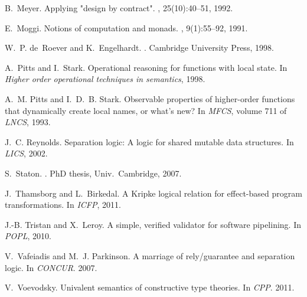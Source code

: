 \documentclass[orivec]{llncs}
\newif\ifapp\apptrue
\begin{document}
\begin{thebibliography}{10}
B.~Meyer.
\newblock Applying "design by contract".
, 25(10):40--51, 1992.


E.~Moggi.
\newblock Notions of computation and monads.
, 9(1):55--92, 1991.


W.~P. de~Roever and K.~Engelhardt.
.
\newblock Cambridge University Press, 1998.



A.~Pitts and I.~Stark.
\newblock Operational reasoning for functions with local state.
\newblock In {\em Higher order operational techniques in semantics},
1998.

A.~M. Pitts and I.~D.~B. Stark.
\newblock Observable properties of higher-order functions that dynamically
  create local names, or what's new?
\newblock In {\em MFCS}, volume 711 of {\em LNCS}, 1993.

J.~C. Reynolds.
\newblock Separation logic: A logic for shared mutable data structures.
\newblock In {\em LICS}, 2002.



S.~Staton.
.
\newblock PhD thesis, Univ.\ Cambridge, 2007.

J.~Thamsborg and L.~Birkedal.
\newblock A {Kripke} logical relation for effect-based program
transformations.
\newblock In {\em ICFP}, 2011.

J.-B. Tristan and X.~Leroy.
\newblock A simple, verified validator for software pipelining.
\newblock In {\em POPL}, 2010.

V.~Vafeiadis and M.~J. Parkinson.
\newblock A marriage of rely/guarantee and separation logic.
\newblock In {\em CONCUR}. 2007.

V.~Voevodsky.
\newblock Univalent semantics of constructive type theories.
\newblock In {\em CPP}. 2011.

\end{thebibliography}


\fi


\ifapp
\newpage
\appendix
\end{document}
